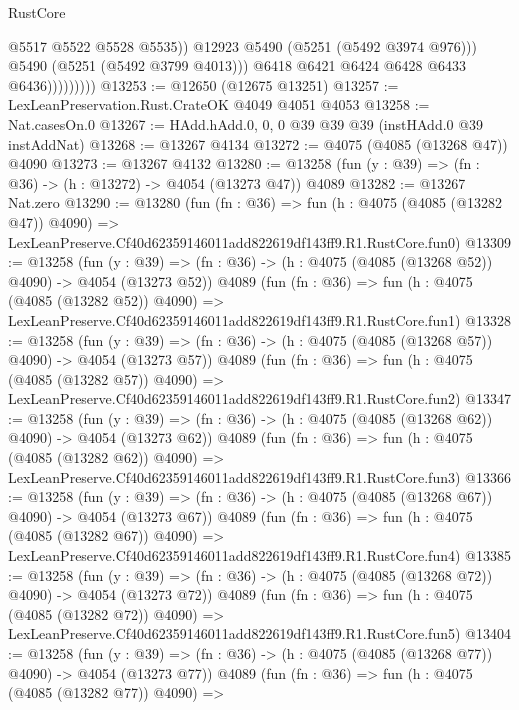 \begin{lexlean}{RustCore}
\begin{coremodule}
                              @5517
                              @5522
                              @5528
                              @5535))
                          @12923
                          @5490
                          (@5251 (@5492 @3974 @976)))
                        @5490
                        (@5251 (@5492 @3799 @4013)))
                      @6418
                      @6421
                      @6424
                      @6428
                      @6433
                      @6436)))))))))
@13253 := @12650 (@12675 @13251)
@13257 := LexLeanPreservation.Rust.CrateOK @4049 @4051 @4053
@13258 := Nat.casesOn.{0}
@13267 := HAdd.hAdd.{0, 0, 0} @39 @39 @39 (instHAdd.{0} @39 instAddNat)
@13268 := @13267 @4134
@13272 := @4075 (@4085 (@13268 @47)) @4090
@13273 := @13267 @4132
@13280 := @13258 (fun (y : @39) => (fn : @36) -> (h : @13272) -> @4054 (@13273 @47)) @4089
@13282 := @13267 Nat.zero
@13290 := @13280
    (fun (fn : @36) =>
    fun (h : @4075 (@4085 (@13282 @47)) @4090) =>
    LexLeanPreserve.Cf40d62359146011add822619df143ff9.R1.RustCore.fun0)
@13309 := @13258
    (fun (y : @39) => (fn : @36) -> (h : @4075 (@4085 (@13268 @52)) @4090) -> @4054 (@13273 @52))
    @4089
    (fun (fn : @36) =>
    fun (h : @4075 (@4085 (@13282 @52)) @4090) =>
    LexLeanPreserve.Cf40d62359146011add822619df143ff9.R1.RustCore.fun1)
@13328 := @13258
    (fun (y : @39) => (fn : @36) -> (h : @4075 (@4085 (@13268 @57)) @4090) -> @4054 (@13273 @57))
    @4089
    (fun (fn : @36) =>
    fun (h : @4075 (@4085 (@13282 @57)) @4090) =>
    LexLeanPreserve.Cf40d62359146011add822619df143ff9.R1.RustCore.fun2)
@13347 := @13258
    (fun (y : @39) => (fn : @36) -> (h : @4075 (@4085 (@13268 @62)) @4090) -> @4054 (@13273 @62))
    @4089
    (fun (fn : @36) =>
    fun (h : @4075 (@4085 (@13282 @62)) @4090) =>
    LexLeanPreserve.Cf40d62359146011add822619df143ff9.R1.RustCore.fun3)
@13366 := @13258
    (fun (y : @39) => (fn : @36) -> (h : @4075 (@4085 (@13268 @67)) @4090) -> @4054 (@13273 @67))
    @4089
    (fun (fn : @36) =>
    fun (h : @4075 (@4085 (@13282 @67)) @4090) =>
    LexLeanPreserve.Cf40d62359146011add822619df143ff9.R1.RustCore.fun4)
@13385 := @13258
    (fun (y : @39) => (fn : @36) -> (h : @4075 (@4085 (@13268 @72)) @4090) -> @4054 (@13273 @72))
    @4089
    (fun (fn : @36) =>
    fun (h : @4075 (@4085 (@13282 @72)) @4090) =>
    LexLeanPreserve.Cf40d62359146011add822619df143ff9.R1.RustCore.fun5)
@13404 := @13258
    (fun (y : @39) => (fn : @36) -> (h : @4075 (@4085 (@13268 @77)) @4090) -> @4054 (@13273 @77))
    @4089
    (fun (fn : @36) =>
    fun (h : @4075 (@4085 (@13282 @77)) @4090) =>

\end{coremodule}
\end{lexlean}
